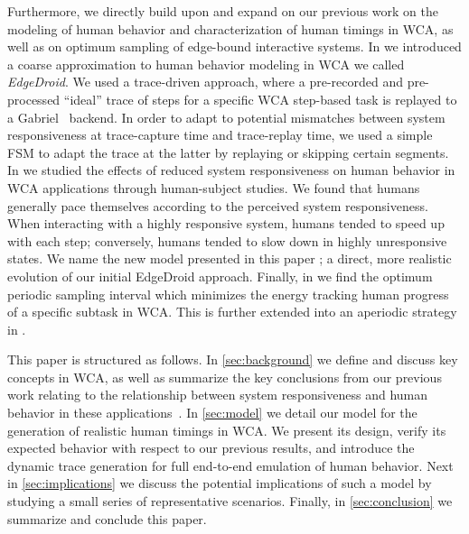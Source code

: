 Furthermore, we directly build upon and expand on our previous work on the modeling of human behavior and characterization of human timings in \ac{WCA}, as well as on optimum sampling of edge-bound interactive systems.
In \textcite{olguin2018scaling,olguin2019edgedroid} we introduced a coarse approximation to human behavior modeling in \ac{WCA} we called \emph{EdgeDroid}.
We used a trace-driven approach, where a pre-recorded and pre-processed ``ideal'' trace of steps for a specific \ac{WCA} step-based task is replayed to a Gabriel~\cite{Chen2018application} backend.
In order to adapt to potential mismatches between system responsiveness at trace-capture time and trace-replay time, we used a simple \ac{FSM} to adapt the trace at the latter by replaying or skipping certain segments.
In \textcite{olguinmunoz:impact2021} we studied the effects of reduced system responsiveness on human behavior in \ac{WCA} applications through human-subject studies.
We found that humans generally pace themselves according to the perceived system responsiveness.
When interacting with a highly responsive system, humans tended to speed up with each step; conversely, humans tended to slow down in highly unresponsive states.
We name the new model presented in this paper \emph{\edgedroid}; a direct, more realistic evolution of our initial EdgeDroid approach.
Finally, in \textcite{ICCperiodic1,TMCperiodic} we find the optimum periodic sampling interval which minimizes the energy tracking human progress of a specific subtask in \ac{WCA}.
This is further extended into an aperiodic strategy in \textcite{secAperiodic}.

This paper is structured as follows.
In \cref{sec:background} we define and discuss key concepts in \ac{WCA}, as well as summarize the key conclusions from our previous work relating to the relationship between system responsiveness and human behavior in these applications~\cite{olguinmunoz:impact2021}.
In \cref{sec:model} we detail our model for the generation of realistic human timings in \ac{WCA}.
We present its design, verify its expected behavior with respect to our previous results, and introduce the dynamic trace generation for full end-to-end emulation of human behavior.
Next in \cref{sec:implications} we discuss the potential implications of such a model by studying a small series of representative scenarios.
Finally, in \cref{sec:conclusion} we summarize and conclude this paper.

